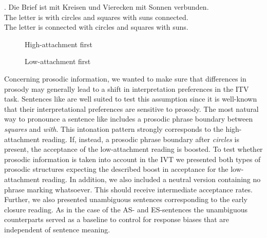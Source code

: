 \documentclass[a4paper,10pt]{article}
\begin{document}
\exg. Die Brief ist mit Kreisen und Vierecken mit Sonnen verbunden.\\
The letter is with circles and squares with suns connected.\\
The letter is connected with circles and squares with suns.

\begin{figure}[ht]
	\centering
	\caption[]{High-attachment first}
	\label{fig:exec}
\end{figure}

\begin{figure}[ht]
	\centering
	\caption[]{Low-attachment first}
	\label{fig:exec}
\end{figure}

Concerning prosodic information, we wanted to make sure that differences in prosody may generally lead to a shift in interpretation preferences in the ITV task. Sentences like \Last are well suited to test this assumption since it is well-known that their interpretational preferences are sensitive to prosody. The most natural way to pronounce a sentence like \Last includes a prosodic phrase boundary between {\it squares} and {\it with}. This intonation pattern strongly corresponds to the high-attachment reading. If, instead, a prosodic phrase boundary after {\it circles} is present, the acceptance of the low-attachment reading is boosted. To test whether prosodic information is taken into account in the IVT we presented both types of prosodic structures expecting the described boost in acceptance for the low-attachment reading. In addition, we also included a neutral version containing no phrase marking whatsoever. This should receive intermediate acceptance rates. Further, we also presented unambiguous sentences corresponding to the early closure reading. As in the case of the AS- and ES-sentences the unambiguous counterparts  served as a baseline to control for response biases that are independent of sentence meaning.  

     



\end{document}
